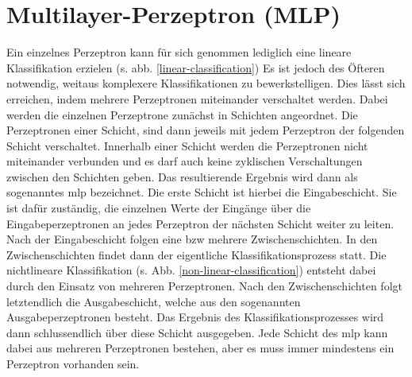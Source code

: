\section{Multilayer-Perzeptron (MLP)}

Ein einzelnes Perzeptron kann für sich genommen lediglich eine lineare Klassifikation erzielen (\acs{s.} \acs{abb.} \ref{linear-classification}) Es ist jedoch des Öfteren notwendig, weitaus komplexere Klassifikationen zu bewerkstelligen. Dies lässt sich erreichen, indem mehrere Perzeptronen miteinander verschaltet werden. Dabei werden die einzelnen Perzeptrone zunächst in Schichten angeordnet. Die Perzeptronen einer Schicht, sind dann jeweils mit jedem Perzeptron der folgenden Schicht verschaltet. Innerhalb einer Schicht werden die Perzeptronen nicht miteinander verbunden und es darf auch keine zyklischen Verschaltungen zwischen den Schichten geben. Das resultierende Ergebnis wird dann als sogenanntes \acf{mlp} bezeichnet. Die erste Schicht ist hierbei die Eingabeschicht. Sie ist dafür zuständig, die einzelnen Werte der Eingänge über die Eingabeperzeptronen an jedes Perzeptron der nächsten Schicht weiter zu leiten. Nach der Eingabeschicht folgen eine \acs{bzw} mehrere Zwischenschichten. In den Zwischenschichten findet dann der eigentliche Klassifikationsprozess statt. Die nichtlineare Klassifikation (s. Abb. \ref{non-linear-classification}) entsteht dabei durch den Einsatz von mehreren Perzeptronen. Nach den Zwischenschichten folgt letztendlich die Ausgabeschicht, welche aus den sogenannten Ausgabeperzeptronen besteht. Das Ergebnis des Klassifikationsprozesses wird dann schlussendlich über diese Schicht ausgegeben. Jede Schicht des \acs{mlp} kann dabei aus mehreren Perzeptronen bestehen, aber es muss immer mindestens ein Perzeptron vorhanden sein. \cite{oliver-gableske}

